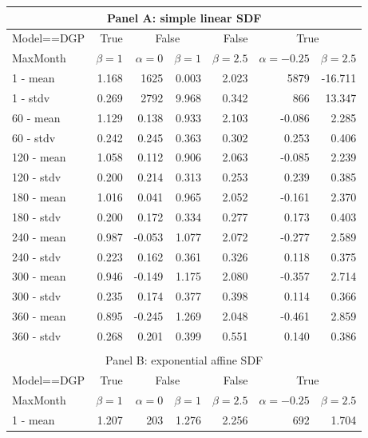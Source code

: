 \documentclass[12pt]{article}
\begin{document}
\begin{table}[ht]
	\centering
	\begin{tabular}{lrrrrrr}
		\multicolumn{7}{c}{Panel A: simple linear SDF} \\
		\hline
		Model==DGP & True & \multicolumn{2}{c}{False} & False & \multicolumn{2}{c}{True} \\
		MaxMonth & $\beta=1$ & $\alpha=0$ & $\beta=1$ & $\beta=2.5$ & $\alpha=-0.25$ & $\beta=2.5$ \\ 
		\hline
		\hline
		1 - mean & 1.168 & 1625 & 0.003 & 2.023 & 5879 & -16.711 \\ 
		1 - stdv & 0.269 & 2792 & 9.968 & 0.342 & 866 & 13.347 \\ 
		\hline
		60 - mean & 1.129 & 0.138 & 0.933 & 2.103 & -0.086 & 2.285 \\ 
		60 - stdv & 0.242 & 0.245 & 0.363 & 0.302 & 0.253 & 0.406 \\ 
		\hline
		120 - mean & 1.058 & 0.112 & 0.906 & 2.063 & -0.085 & 2.239 \\ 
		120 - stdv & 0.200 & 0.214 & 0.313 & 0.253 & 0.239 & 0.385 \\ 
		\hline
		180 - mean & 1.016 & 0.041 & 0.965 & 2.052 & -0.161 & 2.370 \\ 
		180 - stdv & 0.200 & 0.172 & 0.334 & 0.277 & 0.173 & 0.403 \\ 
		\hline
		240 - mean & 0.987 & -0.053 & 1.077 & 2.072 & -0.277 & 2.589 \\ 
		240 - stdv & 0.223 & 0.162 & 0.361 & 0.326 & 0.118 & 0.375 \\
		\hline 
		300 - mean & 0.946 & -0.149 & 1.175 & 2.080 & -0.357 & 2.714 \\ 
		300 - stdv & 0.235 & 0.174 & 0.377 & 0.398 & 0.114 & 0.366 \\ 
		\hline
		360 - mean & 0.895 & -0.245 & 1.269 & 2.048 & -0.461 & 2.859 \\ 
		360 - stdv & 0.268 & 0.201 & 0.399 & 0.551 & 0.140 & 0.386 \\ 
		\hline
		\hline
		\multicolumn{7}{l}{} \\
		\multicolumn{7}{c}{Panel B: exponential affine SDF} \\
		\hline
		Model==DGP & True & \multicolumn{2}{c}{False} & False & \multicolumn{2}{c}{True} \\
		MaxMonth & $\beta=1$ & $\alpha=0$ & $\beta=1$ & $\beta=2.5$ & $\alpha=-0.25$ & $\beta=2.5$ \\ 
		\hline
		\hline
		1 - mean & 1.207 & 203 & 1.276 & 2.256 & 692 & 1.704 \\ 

\end{tabular}
\end{table}
\end{document}
